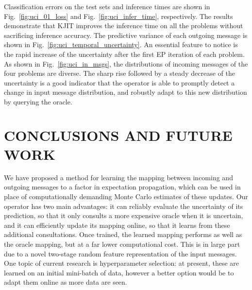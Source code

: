 \documentclass[english]{article}
\theoremstyle{plain}
\theoremstyle{plain}
\newcommand{\figref}[1]{Fig.~\ref{#1}}
\begin{document}
Classification errors on the test sets and inference times are shown in 
\figref{fig:uci_01_loss} and \figref{fig:uci_infer_time}, respectively.
The results demonstrate that KJIT improves the inference time on all the 
problems without sacrificing inference accuracy. The  predictive 
variance of each outgoing message is shown in 
\figref{fig:uci_temporal_uncertainty}. An essential feature to notice is the 
rapid increase of the uncertainty after the first EP iteration of each problem. 
As shown in \figref{fig:uci_in_msgs}, the distributions of incoming messages 
of the four problems are diverse. 
The sharp rise followed by a steady decrease of the uncertainty is a good indicator 
that the operator is able to promptly detect a change in input message distribution,
and robustly adapt to this new distribution by querying the oracle.








\section{CONCLUSIONS AND FUTURE WORK}
\label{sec:Conclusions-and-Future} 

We have proposed a method for learning the mapping between incoming and outgoing
messages to a factor in expectation propagation, which can be used
in place of computationally demanding Monte Carlo estimates of these updates.
Our operator has two main advantages: it can reliably evaluate the uncertainty of its prediction,
so that it only consults a more expensive oracle when it is uncertain,
and it can efficiently update its mapping online, so that it learns
from these additional consultations. Once trained, the learned mapping
performs as well as the oracle mapping, but at a far lower computational cost.
This is in large part due to a novel two-stage random feature representation of the input
messages. One topic of current research is hyperparameter selection:
at present, these are learned on an initial mini-batch of data, however
a better option would be to adapt them online as more data are seen.
\end{document}
